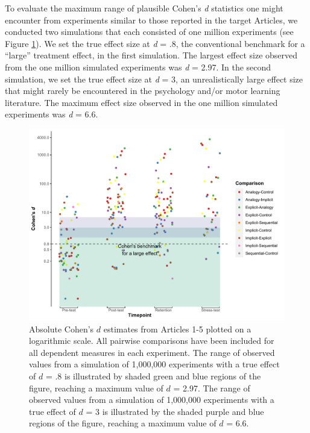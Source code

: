 \documentclass[
  english,
  man, donotrepeattitle,floatsintext]{apa7}
\begin{document}
To evaluate the maximum range of plausible Cohen's \emph{d} statistics one might encounter from experiments similar to those reported in the target Articles, we conducted two simulations that each consisted of one million experiments (see Figure \ref{fig:fig1}). We set the true effect size at \emph{d} = .8, the conventional benchmark for a ``large'' treatment effect, in the first simulation. The largest effect size observed from the one million simulated experiments was \emph{d} = 2.97. In the second simulation, we set the true effect size at \emph{d} = 3, an unrealistically large effect size that might rarely be encountered in the psychology and/or motor learning literature. The maximum effect size observed in the one million simulated experiments was \emph{d} = 6.6.



\begin{figure}

{\centering \includegraphics[width=1\linewidth,height=1\textheight]{../../figs/fig1} 

}

\caption{Absolute Cohen's \(d\) estimates from Articles 1-5 plotted on a logarithmic scale. All pairwise comparisons have been included for all dependent measures in each experiment. The range of observed values from a simulation of 1,000,000 experiments with a true effect of \(d\) = .8 is illustrated by shaded green and blue regions of the figure, reaching a maximum value of \(d\) = 2.97. The range of observed values from a simulation of 1,000,000 experiments with a true effect of \(d\) = 3 is illustrated by the shaded purple and blue regions of the figure, reaching a maximum value of \(d\) = 6.6.}\label{fig:fig1}
\end{figure}
\end{document}
